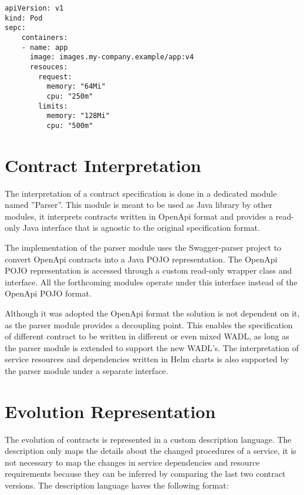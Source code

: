 \begin{lstlisting}[caption=Helm template resources example, label=lst:resource, captionpos=b]
apiVersion: v1
kind: Pod
sepc:
    containers:
    - name: app
      image: images.my-company.example/app:v4
      resouces:
        request:
          memory: "64Mi"
          cpu: "250m"
        limits:
          memory: "128Mi"
          cpu: "500m"
\end{lstlisting}

\section{Contract Interpretation} %
\label{sec:contract_interpretation}

The interpretation of a contract specification is done in a dedicated module named ''Parser''.
This module is meant to be used as Java library by other modules,
it interprets contracts written in OpenApi format and provides a read-only Java interface
that is agnostic to the original specification format.

The implementation of the parser module uses the Swagger-parser project \cite{swaggerparser} to convert OpenApi contracts into a Java POJO representation.
The OpenApi POJO representation is accessed through a custom read-only wrapper class and interface.
All the forthcoming modules operate under this interface instead of the OpenApi POJO format.

Although it was adopted the OpenApi format the solution is not dependent on it, as the parser module provides a decoupling point.
This enables the specification of different contract to be written in different or even mixed WADL,
as long as the parser module is extended to support the new WADL's.
The interpretation of service resources and dependencies written in Helm charts is also supported by the parser module under a separate interface.

\section{Evolution Representation} %
\label{sec:evolution_representation}

The evolution of contracts is represented in a custom description language.
The description only maps the details about the changed procedures of a service,
it is not necessary to map the changes in service dependencies and resource requirements because they can be inferred by comparing the last two contract versions.
The description language haves the following format:

